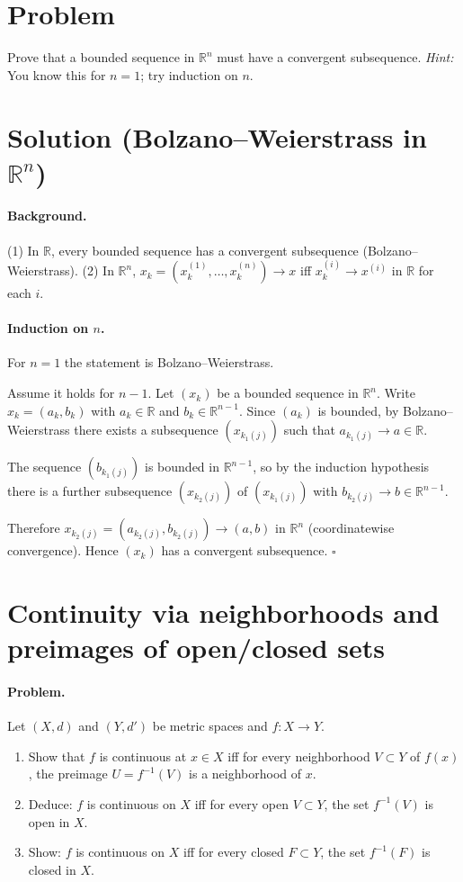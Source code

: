 \documentclass[12pt,a4paper]{article}
\newcommand{\qed}{\hfill$\square$}
\begin{document}
\section*{Problem}
Prove that a bounded sequence in $\mathbb{R}^n$ must have a convergent subsequence.
\emph{Hint:} You know this for $n=1$; try induction on $n$.

\section*{Solution (Bolzano--Weierstrass in $\mathbb{R}^n$)}
\paragraph{Background.}
(1) In $\mathbb{R}$, every bounded sequence has a convergent subsequence (Bolzano--Weierstrass).
(2) In $\mathbb{R}^n$, $x_k=(x_k^{(1)},\dots,x_k^{(n)})\to x$ iff $x_k^{(i)}\to x^{(i)}$ in $\mathbb{R}$ for each $i$.

\paragraph{Induction on $n$.}
For $n=1$ the statement is Bolzano--Weierstrass.

Assume it holds for $n-1$. Let $(x_k)$ be a bounded sequence in $\mathbb{R}^n$. Write $x_k=(a_k,b_k)$ with $a_k\in\mathbb{R}$ and $b_k\in\mathbb{R}^{n-1}$. Since $(a_k)$ is bounded, by Bolzano--Weierstrass there exists a subsequence $(x_{k_1(j)})$ such that $a_{k_1(j)}\to a\in\mathbb{R}$.

The sequence $(b_{k_1(j)})$ is bounded in $\mathbb{R}^{n-1}$, so by the induction hypothesis there is a further subsequence $(x_{k_2(j)})$ of $(x_{k_1(j)})$ with $b_{k_2(j)}\to b\in\mathbb{R}^{n-1}$.

Therefore $x_{k_2(j)}=(a_{k_2(j)},b_{k_2(j)})\to (a,b)$ in $\mathbb{R}^n$ (coordinatewise convergence). Hence $(x_k)$ has a convergent subsequence. \qed
	
	
\section*{Continuity via neighborhoods and preimages of open/closed sets}

\paragraph{Problem.}
Let $(X,d)$ and $(Y,d')$ be metric spaces and $f:X\to Y$.
\begin{enumerate}[label=(\alph*)]
	\item Show that $f$ is continuous at $x\in X$ iff for every neighborhood $V\subset Y$ of $f(x)$, the preimage $U=f^{-1}(V)$ is a neighborhood of $x$.
	\item Deduce: $f$ is continuous on $X$ iff for every open $V\subset Y$, the set $f^{-1}(V)$ is open in $X$.
	\item Show: $f$ is continuous on $X$ iff for every closed $F\subset Y$, the set $f^{-1}(F)$ is closed in $X$.
\end{enumerate}
\end{document}
